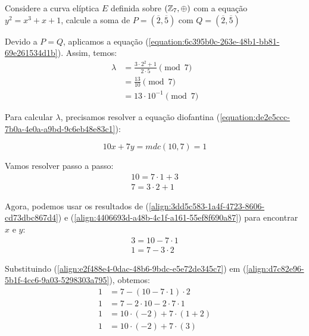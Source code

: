 \begin{exemplo} \label{exemplo:4508c716-b529-4e3d-aa71-9a4493c9b4a7}

	Considere a curva elíptica $E$ definida sobre $(\mathbb{Z}_7, \oplus)$ com a equação
	$y^2 = x^3 + x + 1$, calcule a soma de $P = (\overline{2}, \overline{5})$ com
	$Q = (\overline{2}, \overline{5})$

	Devido a $P = Q$, aplicamos a equação
	(\ref{equation:6c395b0c-263e-48b1-bb81-69e261534d1b}). Assim, temos:
	\begin{align}
		\lambda & = \frac{3 \cdot 2^2 + 1}{2 \cdot 5} \pmod{7} \nonumber                         \\
		        & = \frac{13}{10} \pmod{7} \nonumber                                             \\
		        & = 13 \cdot 10^{-1} \pmod{7} \label{align:09cab5e1-bcec-464c-b850-a4d538d0be1a}
	\end{align}

	\justify
	Para calcular $\lambda$, precisamos resolver a equação diofantina (\ref{equation:de2e5ccc-7b0a-4e0a-a9bd-9c6eb48e83c1}):

	\begin{equation}
		10x + 7y = mdc(10, 7) = 1 \nonumber
	\end{equation}

	\justify
	Vamos resolver passo a passo:
	\begin{align}
		10 = 7 \cdot 1 + 3 \label{align:3dd5c583-1a4f-4723-8606-cd73dbc867d4} \\
		7 = 3 \cdot 2 + 1 \label{align:4406693d-a48b-4c1f-a161-55ef8f690a87}
	\end{align}

	\justify
	Agora, podemos usar os resultados de (\ref{align:3dd5c583-1a4f-4723-8606-cd73dbc867d4}) e (\ref{align:4406693d-a48b-4c1f-a161-55ef8f690a87}) para encontrar $x$ e $y$:
	\begin{align}
		3 = 10 - 7 \cdot 1 \label{align:e2f488e4-0dac-48b6-9bdc-e5e72de345c7} \\
		1 = 7 - 3 \cdot 2\label{align:d7c82e96-5b1f-4cc6-9a03-5298303a795}
	\end{align}

	\justify
	Substituindo (\ref{align:e2f488e4-0dac-48b6-9bdc-e5e72de345c7}) em (\ref{align:d7c82e96-5b1f-4cc6-9a03-5298303a795}), obtemos:
	\begin{align}
		1 & = 7 - (10 - 7 \cdot 1) \cdot 2    \nonumber    \\
		1 & = 7 - 2 \cdot 10 - 2 \cdot 7 \cdot 1 \nonumber \\
		1 & = 10 \cdot (-2) + 7 \cdot (1 + 2)   \nonumber  \\
		1 & = 10 \cdot (-2) + 7 \cdot (3)\nonumber
	\end{align}


\end{exemplo}
